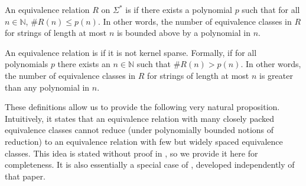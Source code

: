 \begin{definition}
  An equivalence relation $R$ on $\Sigma^*$ is  if there exists a polynomial $p$ such that for all $n\in\mathbb{N}$, $\#R(n)\leq p(n)$.
  In other words, the number of equivalence classes in $R$ for strings of length at most $n$ is bounded above by a polynomial in $n$.

  An equivalence relation is  if it is not kernel sparse.
  Formally, if for all polynomials $p$ there exists an $n\in\mathbb{N}$ such that $\#R(n)>p(n)$.
  In other words, the number of equivalence classes in $R$ for strings of length at most $n$ is greater than any polynomial in $n$.
\end{definition}

These definitions allow us to provide the following very natural proposition.
Intuitively, it states that an equivalence relation with many closely packed equivalence classes cannot reduce (under polynomially bounded notions of reduction) to an equivalence relation with few but widely spaced equivalence classes.
This idea is stated without proof in \autocite[Section~4]{fg11}, so we provide it here for completeness.
It is also essentially a special case of \autocite[Lemma~2.3]{gz14}, developed independently of that paper.

